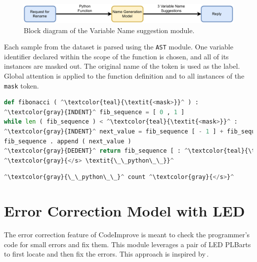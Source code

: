     \begin{figure}[H]
      \centering
      \includegraphics[width=1\textwidth]{obrazky-figures/name generation.pdf}
       \caption{Block diagram of the Variable Name suggestion module.}
      \label{fig:rename-led}
    \end{figure}
    
        Each sample from the dataset is parsed using the \texttt{AST} module. One variable identifier declared within the scope of the function is chosen, and all of its instances are masked out. The original name of the token is used as the label. Global attention is applied to the function definition and to all instances of the \texttt{mask} token.

        \medskip
        \begin{minipage}{.45\textwidth}
            \begin{lstlisting}[language=Python, caption={Example of code in listing \ref{lst:comment} formatted as an input for variable name generation, predicting a new name for \texttt{n}. Italics denote global attention.}]
def fibonacci ( ^\textcolor{teal}{\textit{<mask>}}^ ) :
^\textcolor{gray}{INDENT}^ fib_sequence = [ 0 , 1 ]
while len ( fib_sequence ) < ^\textcolor{teal}{\textit{<mask>}}^ : 
^\textcolor{gray}{INDENT}^ next_value = fib_sequence [ - 1 ] + fib_sequence [ - 2 ]
fib_sequence . append ( next_value )
^\textcolor{gray}{DEDENT}^ return fib_sequence [ : ^\textcolor{teal}{\textit{<mask>}}^ ]
^\textcolor{gray}{</s> \textit{\_\_python\_\_}}^
            \end{lstlisting}

        \end{minipage}
        \hfill
        \begin{minipage}{.45\textwidth}
            \begin{lstlisting}[language=Python, caption={Code in listing \ref{lst:comment} formatted as a label.}]
^\textcolor{gray}{\_\_python\_\_}^ count ^\textcolor{gray}{</s>}^
            \end{lstlisting}
        \end{minipage}
        
    \section{Error Correction Model with LED}
        The error correction feature of CodeImprove is meant to check the programmer's code for small errors and fix them. This module leverages a pair of LED PLBarts to first locate and then fix the errors. This approach is inspired by\,\cite{mashhadi2021applying}.
        
